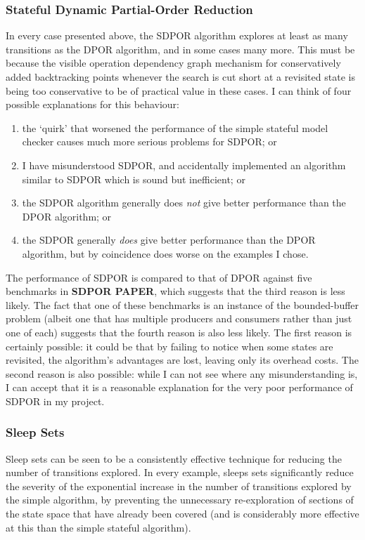 \documentclass[12pt,a4paper,twoside,openright]{report}
\begin{document}
\subsubsection{Stateful Dynamic Partial-Order Reduction}
In every case presented above, the SDPOR algorithm
explores at least as many transitions as the DPOR
algorithm, and in some cases many more. This must
be because the visible operation dependency graph
mechanism for conservatively added backtracking
points whenever the search is cut short at a
revisited state is being too conservative to be
of practical value in these cases. I can think
of four possible explanations for this behaviour:
\begin{enumerate}
	\item the `quirk' that worsened the performance
	of the simple stateful model checker causes
	much more serious problems for SDPOR; or
	\item I have misunderstood SDPOR, and
	accidentally implemented an algorithm similar
	to SDPOR which is sound but inefficient; or
	\item the SDPOR algorithm generally does \emph{not}
	give better performance than the DPOR algorithm; or
	\item the SDPOR generally \emph{does} give better
	performance than the DPOR algorithm, but by
	coincidence does worse on the examples I chose.
\end{enumerate}
The performance of SDPOR is compared to that of DPOR
against five benchmarks in \textbf{SDPOR PAPER},
which suggests that the third reason is less likely.
The fact that one of these benchmarks is an instance
of the bounded-buffer problem (albeit one that
has multiple producers and consumers rather than
just one of each) suggests that the fourth reason
is also less likely. The first reason is certainly
possible: it could be that by failing to notice
when some states are revisited, the algorithm's
advantages are lost, leaving only its overhead
costs.
The second reason is also possible:
while I can not see where any
misunderstanding is, I can accept that it is
a reasonable explanation for the very poor
performance of SDPOR in my project.

\subsubsection{Sleep Sets}
Sleep sets can be seen to be a consistently
effective technique for reducing the number
of transitions explored. In every example,
sleeps sets significantly reduce the
severity of the exponential increase in
the number of transitions explored by the
simple algorithm, by preventing the
unnecessary re-exploration of sections
of the state space that have already been
covered (and is considerably more effective
at this than the simple stateful algorithm).
\end{document}
